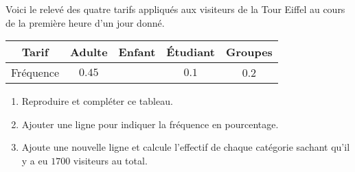 
\begin{exercice}\label{exo2smath-0302}


Voici le relevé des quatre tarifs appliqués aux visiteurs de la Tour Eiffel au cours de la première heure d'un jour donné.

\begin{center}
\begin{tabular}[]{|c|c|c|c|c|}
    \hline
    Tarif&Adulte&Enfant&Étudiant&Groupes\\
    \hline
    Fréquence&\( 0.45\)&&\( 0.1\)&0.2\\
    \hline
\end{tabular}
    
\end{center}

\begin{enumerate}
    \item
        
 Reproduire et compléter ce tableau.
 \item
Ajouter une ligne pour indiquer la fréquence en pourcentage.
\item
 Ajoute une nouvelle ligne et calcule l'effectif de chaque catégorie sachant qu'il y a eu $1 700$ visiteurs au total.
\end{enumerate}

\end{exercice}
